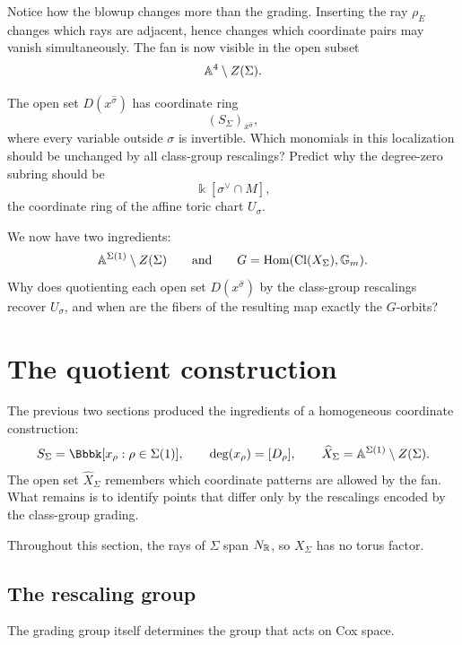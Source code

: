 Notice how the blowup changes more than the grading. Inserting the ray
\(\rho_E\) changes which rays are adjacent, hence changes which
coordinate pairs may vanish simultaneously. The fan is now visible in
the open subset
\[
\mathbb{A}^4\setminus Z(\Sigma).
\]

\begin{prediction}
The open set \(D(x^{\widehat\sigma})\) has coordinate ring
\[
(S_\Sigma)_{x^{\widehat\sigma}},
\]
where every variable outside \(\sigma\) is invertible. Which monomials
in this localization should be unchanged by all class-group
rescalings? Predict why the degree-zero subring should be
\[
\Bbbk[\sigma^\vee\cap M],
\]
the coordinate ring of the affine toric chart \(U_\sigma\).
\end{prediction}

\begin{guidingquestion}
We now have two ingredients:
\[
\mathbb{A}^{\Sigma(1)}\setminus Z(\Sigma)
\qquad\text{and}\qquad
G=\operatorname{Hom}(\operatorname{Cl}(X_\Sigma),\mathbb{G}_{m}).
\]
Why does quotienting each open set \(D(x^{\widehat\sigma})\) by the
class-group rescalings recover \(U_\sigma\), and when are the fibers of
the resulting map exactly the \(G\)-orbits?
\end{guidingquestion}

\section{The quotient construction}
\label{sec:cox-quotient-construction}

The previous two sections produced the ingredients of a homogeneous
coordinate construction:
\[
S_\Sigma=\Bbbk[x_\rho:\rho\in\Sigma(1)],
\qquad
\deg(x_\rho)=[D_\rho],
\qquad
\widehat X_\Sigma
=
\AAA^{\Sigma(1)}\setminus Z(\Sigma).
\]
The open set \(\widehat X_\Sigma\) remembers which coordinate patterns
are allowed by the fan. What remains is to identify points that differ
only by the rescalings encoded by the class-group grading.

Throughout this section, the rays of \(\Sigma\) span \(N_{\mathbb{R}}\), so
\(X_\Sigma\) has no torus factor.

\subsection{The rescaling group}

The grading group itself determines the group that acts on Cox space.

